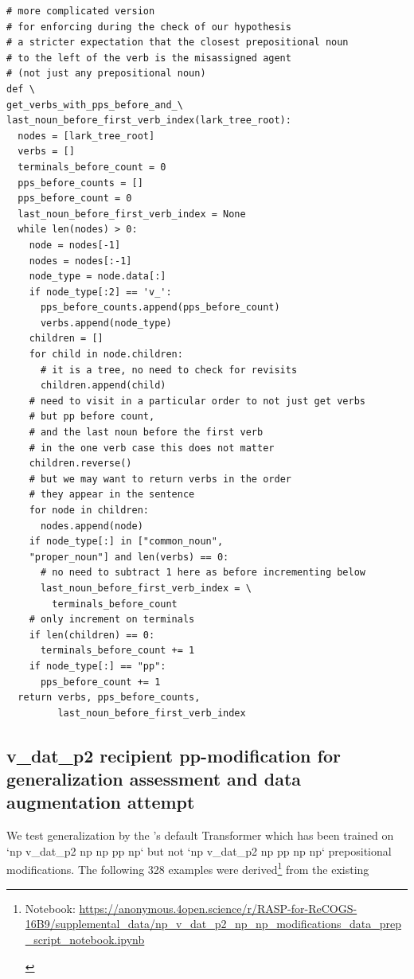 \documentclass[11pt]{article}
\begin{document}
\begin{tiny}
\begin{verbatim}
# more complicated version
# for enforcing during the check of our hypothesis
# a stricter expectation that the closest prepositional noun
# to the left of the verb is the misassigned agent
# (not just any prepositional noun)
def \
get_verbs_with_pps_before_and_\
last_noun_before_first_verb_index(lark_tree_root):
  nodes = [lark_tree_root]
  verbs = []
  terminals_before_count = 0
  pps_before_counts = []
  pps_before_count = 0
  last_noun_before_first_verb_index = None
  while len(nodes) > 0:
    node = nodes[-1]
    nodes = nodes[:-1]
    node_type = node.data[:]
    if node_type[:2] == 'v_':
      pps_before_counts.append(pps_before_count)
      verbs.append(node_type)
    children = []
    for child in node.children:
      # it is a tree, no need to check for revisits
      children.append(child)
    # need to visit in a particular order to not just get verbs
    # but pp before count, 
    # and the last noun before the first verb
    # in the one verb case this does not matter 
    children.reverse()
    # but we may want to return verbs in the order
    # they appear in the sentence
    for node in children:
      nodes.append(node)
    if node_type[:] in ["common_noun",
    "proper_noun"] and len(verbs) == 0:
      # no need to subtract 1 here as before incrementing below
      last_noun_before_first_verb_index = \
        terminals_before_count
    # only increment on terminals
    if len(children) == 0:
      terminals_before_count += 1
    if node_type[:] == "pp":
      pps_before_count += 1
  return verbs, pps_before_counts,
         last_noun_before_first_verb_index
\end{verbatim}
\end{tiny}

\clearpage
\subsection{v\_dat\_p2 recipient pp-modification for generalization assessment and data augmentation attempt}
\label{v_dat_p2_recipient_pp-modification_for_generalization_assessment_and_data_augmentation_attempt}

We test generalization by the \cite{Wu2023}'s default Transformer which has been trained on `np v\_dat\_p2 np np pp np` but not `np v\_dat\_p2 np pp np np` prepositional modifications.
The following 328 examples were derived\footnote{\begin{footnotesize} Notebook:  \href{https://anonymous.4open.science/r/RASP-for-ReCOGS-16B9/supplemental_data/np_v_dat_p2_np_np_modifications_data_prep_script_notebook.ipynb}{https://anonymous.4open.science/r/RASP-for-ReCOGS-16B9/supplemental\_data/np\_v\_dat\_p2\_np\_np\_modifications\_data\_prep\_script\_notebook.ipynb} \end{footnotesize}} from the existing
\end{document}
